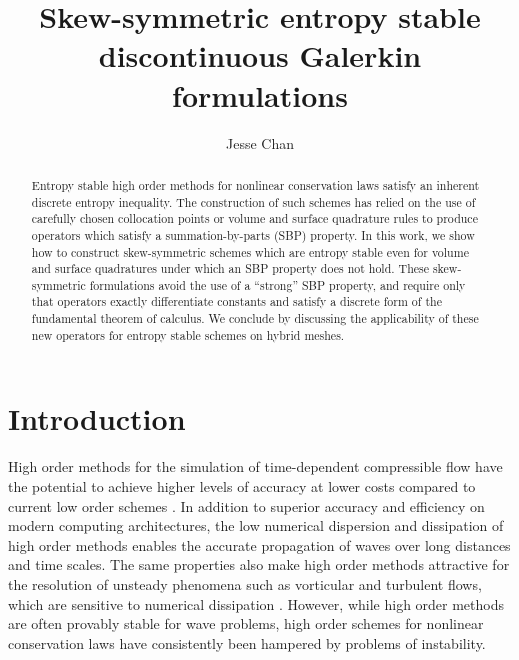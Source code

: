 \documentclass[review]{siamart0216}
\date{}
\author{Jesse Chan}%
\title{Skew-symmetric entropy stable discontinuous Galerkin formulations}
\theoremstyle{assumption}
\begin{document}
\maketitle


\begin{abstract}
Entropy stable high order methods for nonlinear conservation laws satisfy an inherent discrete entropy inequality.  The construction of such schemes has relied on the use of carefully chosen collocation points \cite{gassner2013skew, fisher2013high, carpenter2014entropy, chan2018efficient} or volume and surface quadrature rules \cite{chan2017discretely, chan2018discretely} to produce operators which satisfy a summation-by-parts (SBP) property.  In this work, we show how to construct skew-symmetric schemes which are entropy stable even for volume and surface quadratures under which an SBP property does not hold.  These skew-symmetric formulations avoid the use of a ``strong'' SBP property, and require only that operators exactly differentiate constants and satisfy a discrete form of the fundamental theorem of calculus.  We conclude by discussing the applicability of these new operators for entropy stable schemes on hybrid meshes.%
\end{abstract}

\section{Introduction}

High order methods for the simulation of time-dependent compressible flow have the potential to achieve higher levels of accuracy at lower costs compared to current low order schemes \cite{wang2013high}.  In addition to superior accuracy and efficiency on modern computing architectures, the low numerical dispersion and dissipation of high order methods \cite{ainsworth2004dispersive} enables the accurate propagation of waves over long distances and time scales.  The same properties also make high order methods attractive for the resolution of unsteady phenomena such as vorticular and turbulent flows, which are sensitive to numerical dissipation \cite{visbal1999high, wang2013high}.  However, while high order methods are often provably stable for wave problems, high order schemes for nonlinear conservation laws have consistently been hampered by problems of instability.  
\end{document}
